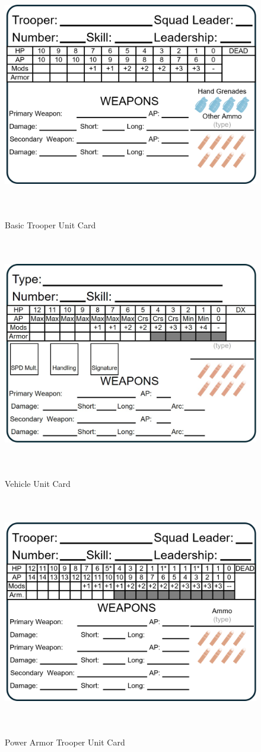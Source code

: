 \begin{figure}[H]
  \centering
  \includegraphics[alt='Sample Basic Trooper', width=5.63in, height=4in]{img/BasicTrooper.png}
  \caption*{Basic Trooper Unit Card}
\end{figure}

\begin{figure}[H]
  \centering
  \includegraphics[alt='Sample Vehicle', width=5.63in, height=4in]{img/Vehicle.png}
  \caption*{Vehicle Unit Card}
\end{figure}

\begin{figure}[H]
  \centering
  \includegraphics[alt='Sample Power Armor Trooper', width=5.63in, height=4in]{img/PowerArmorTrooper.png}
  \caption*{Power Armor Trooper Unit Card}
\end{figure}

